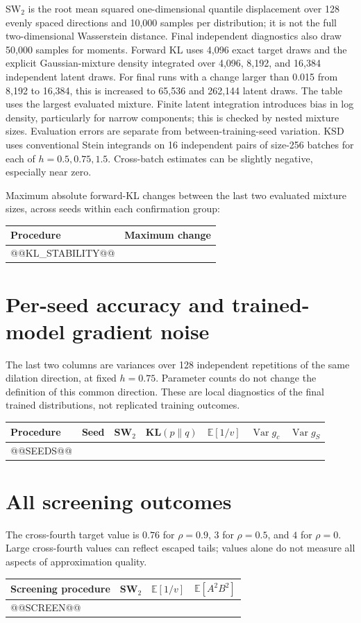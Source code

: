 \documentclass[11pt,a4paper]{article}
\numberwithin{equation}{section}
\newcommand{\E}{\mathbb E}
\newcommand{\Var}{\operatorname{Var}}
\begin{document}
SW$_2$ is the root mean squared one-dimensional quantile displacement over
128 evenly spaced directions and 10,000 samples per distribution; it is
not the full two-dimensional Wasserstein distance. Final independent
diagnostics also draw 50,000 samples for moments. Forward KL uses 4,096 exact
target draws and the explicit Gaussian-mixture density integrated over
4,096, 8,192, and 16,384 independent latent draws. For final runs with a
change larger than 0.015 from 8,192 to 16,384, this is increased to 65,536
and 262,144 latent draws. The table uses the largest evaluated mixture.
Finite latent integration
introduces bias in log density, particularly for narrow components; this is
checked by nested mixture sizes. Evaluation errors are separate from
between-training-seed variation. KSD uses conventional Stein integrands on
16 independent pairs of size-256 batches for each of $h=0.5,0.75,1.5$.
Cross-batch estimates can be slightly negative, especially near zero.

Maximum absolute forward-KL changes between the last two evaluated mixture
sizes, across seeds within each confirmation group:
\begin{center}\small
\begin{tabular}{p{9cm}r}\toprule
Procedure & Maximum change\\\midrule
@@KL_STABILITY@@
\bottomrule\end{tabular}
\end{center}

\appendix
\section{Per-seed accuracy and trained-model gradient noise}
The last two columns are variances over 128 independent repetitions of the
same dilation direction, at fixed $h=0.75$. Parameter counts do not change
the definition of this common direction. These are local diagnostics of
the final trained distributions, not replicated training outcomes.
\small
\begin{longtable}{p{4.25cm}rrrrrr}\toprule
Procedure & Seed & SW$_2$ & KL$(p\|q)$ & $\E[1/v]$ & $\Var g_c$ & $\Var g_S$\\\midrule
\endhead
@@SEEDS@@
\bottomrule\end{longtable}
\normalsize
\section{All screening outcomes}
The cross-fourth target value is $0.76$ for $\rho=0.9$, $3$ for $\rho=0.5$,
and $4$ for $\rho=0$. Large cross-fourth values can reflect escaped tails;
values alone do not measure all aspects of approximation quality.
\small
\begin{longtable}{p{7cm}rrr}\toprule
Screening procedure & SW$_2$ & $\E[1/v]$ & $\E[A^2B^2]$\\\midrule
\endhead
@@SCREEN@@
\bottomrule\end{longtable}
\normalsize
\end{document}

